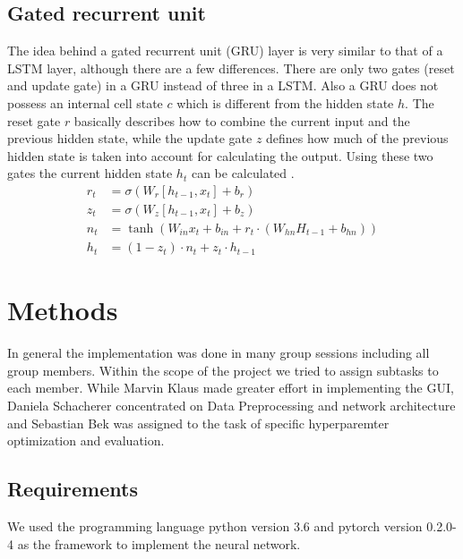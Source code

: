 \documentclass[11pt,a4paper,bibliography=totocnumbered,listof=totocnumbered]{scrartcl}
\begin{document}
\subsection{Gated recurrent unit}
The idea behind a gated recurrent unit (GRU) layer is very similar to that of a LSTM layer, although there are a few differences. There are only two gates (reset and update gate)  in a GRU instead of three in a LSTM. Also a GRU does not possess an internal cell state $c$ which is different from the hidden state $h$. The reset gate $r$ basically describes how to combine the current input and the previous hidden state, while the update gate $z$ defines how much of the previous hidden state is taken into account for calculating the output. Using these two gates the current hidden state $h_t$ can be calculated \cite{gulli2017deep}. 
\begin{align*}
	r_t &= \sigma(W_r [h_{t-1},x_t] + b_r) \\
	z_t &= \sigma(W_z [h_{t-1},x_t] + b_z) \\
	n_t &= \tanh(W_{in} x_t + b_{in} + r_t \cdot (W_{hn}H_{t-1} + b_{hn})) \\
	h_t &= (1-z_t) \cdot n_t + z_t \cdot h_{t-1}
\end{align*}

\pagebreak


%
\section{Methods}
In general the implementation was done in many group sessions including all group members. 
Within the scope of the project we tried to assign subtasks to each member. While Marvin Klaus made greater effort in implementing the GUI, Daniela Schacherer concentrated on Data Preprocessing and network architecture and Sebastian Bek was assigned to the task of specific hyperparemter optimization and evaluation. 

\subsection{Requirements}
We used the programming language python version 3.6 and pytorch version 0.2.0-4 as the framework to implement the neural network. 
\end{document}
